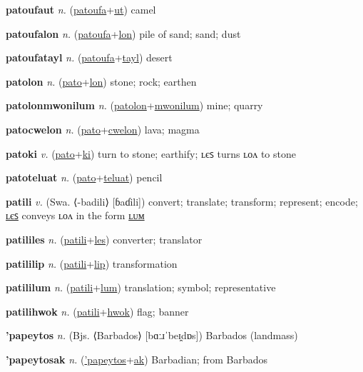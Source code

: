 \textbf{\hypertarget{patoufaut}{patoufaut}} \textit{n.} (\hyperlink{patoufa}{patoufa}+\allowbreak \hyperlink{ut}{ut})
camel

\textbf{\hypertarget{patoufalon}{patoufalon}} \textit{n.} (\hyperlink{patoufa}{patoufa}+\allowbreak \hyperlink{lon}{lon})
pile of sand; sand; dust

\textbf{\hypertarget{patoufatayl}{patoufatayl}} \textit{n.} (\hyperlink{patoufa}{patoufa}+\allowbreak \hyperlink{tayl}{tayl})
desert

\textbf{\hypertarget{patolon}{patolon}} \textit{n.} (\hyperlink{pato}{pato}+\allowbreak \hyperlink{lon}{lon})
stone; rock; earthen

\textbf{\hypertarget{patolonmwonilum}{patolonmwonilum}} \textit{n.} (\hyperlink{patolon}{patolon}+\allowbreak \hyperlink{mwonilum}{mwonilum})
mine; quarry

\textbf{\hypertarget{patocwelon}{patocwelon}} \textit{n.} (\hyperlink{pato}{pato}+\allowbreak \hyperlink{cwelon}{cwelon})
lava; magma

\textbf{\hypertarget{patoki}{patoki}} \textit{v.} (\hyperlink{pato}{pato}+\allowbreak \hyperlink{ki}{ki})
turn to stone; earthify; ʟєꜱ turns ʟᴏᴧ to stone

\textbf{\hypertarget{patoteluat}{patoteluat}} \textit{n.} (\hyperlink{pato}{pato}+\allowbreak \hyperlink{teluat}{teluat})
pencil

\textbf{\hypertarget{patili}{patili}} \textit{v.} (Swa. ⟨-badili⟩ [ɓaɗili])
convert; translate; transform; represent; encode; \hyperlink{patililes}{ʟєꜱ} conveys ʟᴏᴧ in the form \hyperlink{patililum}{ʟᴜᴍ}

\textbf{\hypertarget{patililes}{patililes}} \textit{n.} (\hyperlink{patili}{patili}+\allowbreak \hyperlink{les}{les})
converter; translator

\textbf{\hypertarget{patililip}{patililip}} \textit{n.} (\hyperlink{patili}{patili}+\allowbreak \hyperlink{lip}{lip})
transformation

\textbf{\hypertarget{patililum}{patililum}} \textit{n.} (\hyperlink{patili}{patili}+\allowbreak \hyperlink{lum}{lum})
translation; symbol; representative

\textbf{\hypertarget{patilihwok}{patilihwok}} \textit{n.} (\hyperlink{patili}{patili}+\allowbreak \hyperlink{hwok}{hwok})
flag; banner

\textbf{\hypertarget{'papeytos}{'papeytos}} \textit{n.} (Bjs. ⟨Barbados⟩ [bɑːɹˈbeɪ̯dɒs])
Barbados (landmass)

\textbf{\hypertarget{'papeytosak}{'papeytosak}} \textit{n.} (\hyperlink{'papeytos}{'papeytos}+\allowbreak \hyperlink{ak}{ak})
Barbadian; from Barbados

